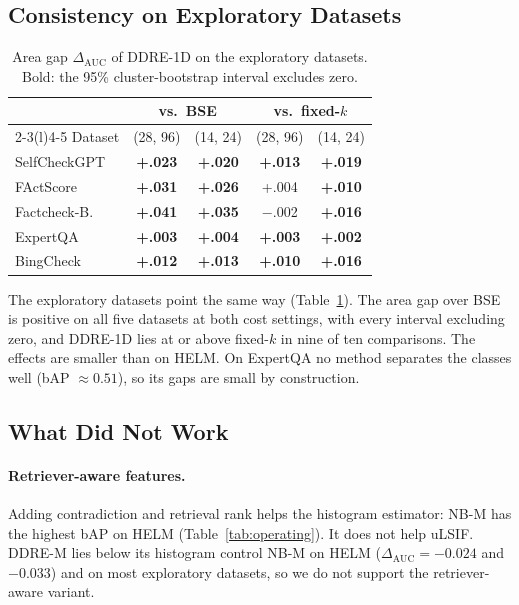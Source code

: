 \documentclass[11pt]{article}
\begin{document}
\subsection{Consistency on Exploratory Datasets}

\begin{table}[t]
\centering\small
\setlength{\tabcolsep}{3.5pt}
\begin{tabular}{@{}lcccc@{}}
\toprule
 & \multicolumn{2}{c}{vs.\ BSE} & \multicolumn{2}{c}{vs.\ fixed-$k$} \\
\cmidrule(lr){2-3}\cmidrule(l){4-5}
Dataset & (28, 96) & (14, 24) & (28, 96) & (14, 24) \\
\midrule
SelfCheckGPT & \textbf{+.023} & \textbf{+.020} & \textbf{+.013} & \textbf{+.019} \\
FActScore & \textbf{+.031} & \textbf{+.026} & +.004 & \textbf{+.010} \\
Factcheck-B. & \textbf{+.041} & \textbf{+.035} & $-$.002 & \textbf{+.016} \\
ExpertQA & \textbf{+.003} & \textbf{+.004} & \textbf{+.003} & \textbf{+.002} \\
BingCheck & \textbf{+.012} & \textbf{+.013} & \textbf{+.010} & \textbf{+.016} \\
\bottomrule
\end{tabular}
\caption{Area gap $\Delta_{\mathrm{AUC}}$ of DDRE-1D on the exploratory
datasets. Bold: the 95\% cluster-bootstrap interval excludes zero.}
\label{tab:explore}
\end{table}

The exploratory datasets point the same way (Table~\ref{tab:explore}). The
area gap over BSE is positive on all five datasets at both cost settings, with
every interval excluding zero, and DDRE-1D lies at or above fixed-$k$ in nine
of ten comparisons. The effects are smaller than on HELM. On ExpertQA no
method separates the classes well (bAP $\approx 0.51$), so its gaps are small
by construction.

\subsection{What Did Not Work}
\label{sec:negative}

\paragraph{Retriever-aware features.} Adding contradiction and retrieval rank
helps the histogram estimator: NB-M has the highest bAP on HELM
(Table~\ref{tab:operating}). It does not help uLSIF. DDRE-M lies below its
histogram control NB-M on HELM ($\Delta_{\mathrm{AUC}} = -0.024$ and $-0.033$)
and on most exploratory datasets, so we do not support the retriever-aware
variant.
\end{document}
